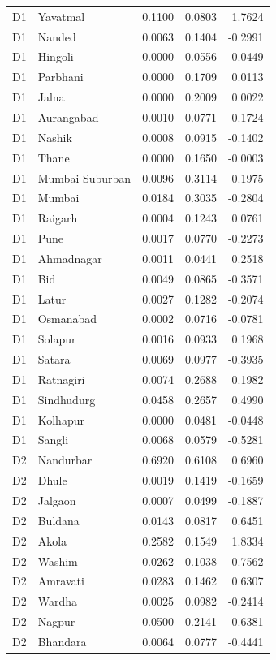 \documentclass[11pt,a4paper]{report}
\begin{document}
\begin{longtable}{l>{\raggedright\arraybackslash}p{5cm}rrr}
D1 & Yavatmal & 0.1100 & 0.0803 & 1.7624 \\
D1 & Nanded & 0.0063 & 0.1404 & -0.2991 \\
D1 & Hingoli & 0.0000 & 0.0556 & 0.0449 \\
D1 & Parbhani & 0.0000 & 0.1709 & 0.0113 \\
D1 & Jalna & 0.0000 & 0.2009 & 0.0022 \\
D1 & Aurangabad & 0.0010 & 0.0771 & -0.1724 \\
D1 & Nashik & 0.0008 & 0.0915 & -0.1402 \\
D1 & Thane & 0.0000 & 0.1650 & -0.0003 \\
D1 & Mumbai Suburban & 0.0096 & 0.3114 & 0.1975 \\
D1 & Mumbai & 0.0184 & 0.3035 & -0.2804 \\
D1 & Raigarh & 0.0004 & 0.1243 & 0.0761 \\
D1 & Pune & 0.0017 & 0.0770 & -0.2273 \\
D1 & Ahmadnagar & 0.0011 & 0.0441 & 0.2518 \\
D1 & Bid & 0.0049 & 0.0865 & -0.3571 \\
D1 & Latur & 0.0027 & 0.1282 & -0.2074 \\
D1 & Osmanabad & 0.0002 & 0.0716 & -0.0781 \\
D1 & Solapur & 0.0016 & 0.0933 & 0.1968 \\
D1 & Satara & 0.0069 & 0.0977 & -0.3935 \\
D1 & Ratnagiri & 0.0074 & 0.2688 & 0.1982 \\
D1 & Sindhudurg & 0.0458 & 0.2657 & 0.4990 \\
D1 & Kolhapur & 0.0000 & 0.0481 & -0.0448 \\
D1 & Sangli & 0.0068 & 0.0579 & -0.5281 \\
D2 & Nandurbar & 0.6920 & 0.6108 & 0.6960 \\
D2 & Dhule & 0.0019 & 0.1419 & -0.1659 \\
D2 & Jalgaon & 0.0007 & 0.0499 & -0.1887 \\
D2 & Buldana & 0.0143 & 0.0817 & 0.6451 \\
D2 & Akola & 0.2582 & 0.1549 & 1.8334 \\
D2 & Washim & 0.0262 & 0.1038 & -0.7562 \\
D2 & Amravati & 0.0283 & 0.1462 & 0.6307 \\
D2 & Wardha & 0.0025 & 0.0982 & -0.2414 \\
D2 & Nagpur & 0.0500 & 0.2141 & 0.6381 \\
D2 & Bhandara & 0.0064 & 0.0777 & -0.4441 \\

\end{longtable}
\end{document}
